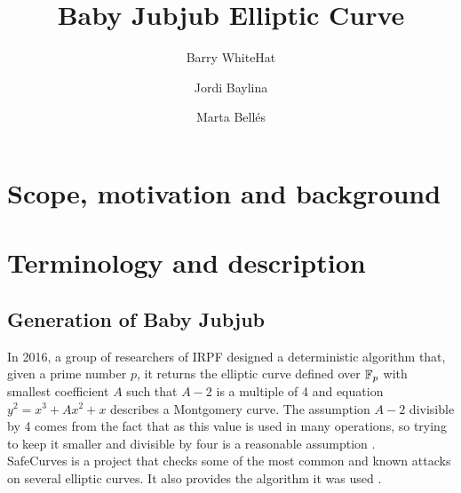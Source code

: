 \documentclass{article}
\title{ Baby Jubjub Elliptic Curve \vspace{-0.2cm} }
\author[1]{Barry WhiteHat}
\author[2]{Jordi Baylina}
\author[2,3]{Marta Bellés}
\affil[1]{Ethereum foundation}
\affil[2]{iden3}
\affil[3]{Universitat Pompeu Fabra}
\date{} %
\begin{document}
\begin{spacing}{1.2}	
\maketitle 
\vspace{1.5cm}
\tableofcontents
\vspace{0.5cm}


\newpage

\section{Scope, motivation and background}	

\section{Terminology and description}
	\subsection{Generation of Baby Jubjub}

	In 2016, a group of researchers of IRPF designed a deterministic algorithm that, given a prime number $p$, it returns the elliptic curve defined over $\mathbb{F}_p$ with smallest coefficient $A$ such that $A-2$ is a multiple of 4 and equation $y^2 = x^3 + Ax^2 + x$ describes a Montgomery curve. The assumption $A-2$ divisible by 4 comes from the fact that as 
	this value is used in many operations, so trying to keep it smaller and divisible by four is a reasonable assumption \cite{generation-baby}. \\

	SafeCurves is a project that checks some of the most common and known attacks on several elliptic curves. It also provides the algorithm it was used \cite{safe-curves}.\\ 
	

\end{spacing}
\end{document}
